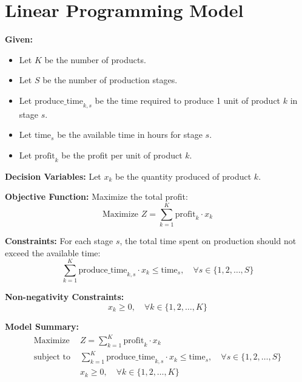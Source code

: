 \documentclass{article}
\begin{document}
\section*{Linear Programming Model}

\textbf{Given:}
\begin{itemize}
    \item Let \( K \) be the number of products.
    \item Let \( S \) be the number of production stages.
    \item Let \( \text{produce\_time}_{k,s} \) be the time required to produce 1 unit of product \( k \) in stage \( s \).
    \item Let \( \text{time}_{s} \) be the available time in hours for stage \( s \).
    \item Let \( \text{profit}_{k} \) be the profit per unit of product \( k \).
\end{itemize}

\textbf{Decision Variables:}
Let \( x_k \) be the quantity produced of product \( k \).

\textbf{Objective Function:}
Maximize the total profit:
\[
\text{Maximize } Z = \sum_{k=1}^{K} \text{profit}_{k} \cdot x_k
\]

\textbf{Constraints:}
For each stage \( s \), the total time spent on production should not exceed the available time:
\[
\sum_{k=1}^{K} \text{produce\_time}_{k,s} \cdot x_k \leq \text{time}_{s}, \quad \forall s \in \{1, 2, \ldots, S\}
\]

\textbf{Non-negativity Constraints:}
\[
x_k \geq 0, \quad \forall k \in \{1, 2, \ldots, K\}
\]

\textbf{Model Summary:}
\begin{align*}
\text{Maximize } & Z = \sum_{k=1}^{K} \text{profit}_{k} \cdot x_k \\
\text{subject to } & \sum_{k=1}^{K} \text{produce\_time}_{k,s} \cdot x_k \leq \text{time}_{s}, \quad \forall s \in \{1, 2, \ldots, S\} \\
& x_k \geq 0, \quad \forall k \in \{1, 2, \ldots, K\}
\end{align*}
\end{document}
